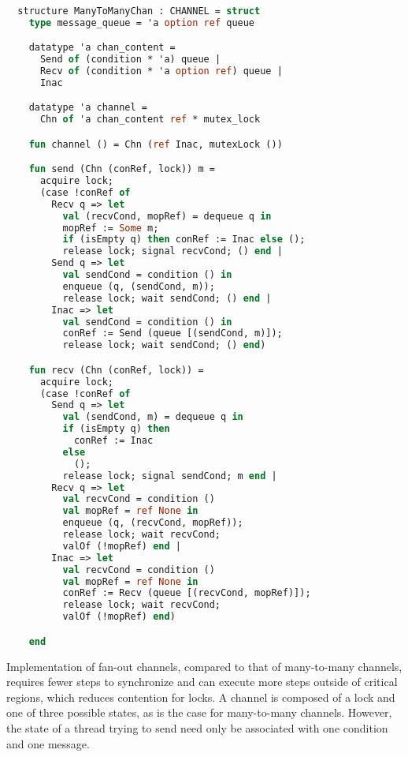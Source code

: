 \documentclass{article}
\begin{document}
\begin{lstlisting}[language=ML, style=codestyle1, escapechar=\%]

  structure ManyToManyChan : CHANNEL = struct
    type message_queue = 'a option ref queue

    datatype 'a chan_content = 
      Send of (condition * 'a) queue | 
      Recv of (condition * 'a option ref) queue | 
      Inac

    datatype 'a channel =
      Chn of 'a chan_content ref * mutex_lock 

    fun channel () = Chn (ref Inac, mutexLock ())

    fun send (Chn (conRef, lock)) m = 
      acquire lock;
      (case !conRef of
        Recv q => let
          val (recvCond, mopRef) = dequeue q in
          mopRef := Some m;
          if (isEmpty q) then conRef := Inac else (); 
          release lock; signal recvCond; () end |
        Send q => let
          val sendCond = condition () in
          enqueue (q, (sendCond, m));
          release lock; wait sendCond; () end |
        Inac => let
          val sendCond = condition () in
          conRef := Send (queue [(sendCond, m)]);
          release lock; wait sendCond; () end)

    fun recv (Chn (conRef, lock)) =  
      acquire lock;
      (case !conRef of 
        Send q => let
          val (sendCond, m) = dequeue q in
          if (isEmpty q) then
            conRef := Inac
          else
            (); 
          release lock; signal sendCond; m end |
        Recv q => let
          val recvCond = condition ()
          val mopRef = ref None in
          enqueue (q, (recvCond, mopRef));
          release lock; wait recvCond;
          valOf (!mopRef) end |
        Inac => let
          val recvCond = condition ()
          val mopRef = ref None in
          conRef := Recv (queue [(recvCond, mopRef)]);
          release lock; wait recvCond;
          valOf (!mopRef) end)

    end

  \end{lstlisting}


Implementation of fan-out channels, compared to that of many-to-many channels, requires fewer
steps to synchronize and can execute more steps outside of critical regions, which reduces
contention for locks.  A channel is composed of a lock and one of three possible states, as is
the case for many-to-many channels.  However, the state of a thread trying to send need only be
associated with one condition and one message.  
\end{document}
